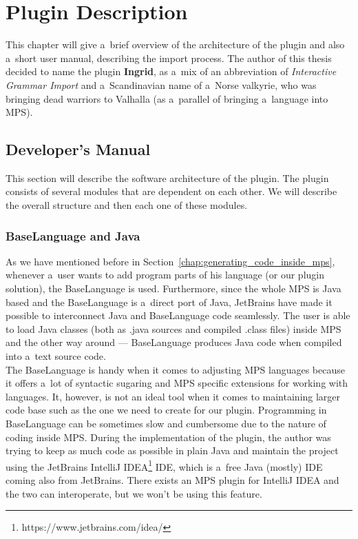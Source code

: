 \chapter{Plugin Description}

This chapter will give a~brief overview of the architecture of the plugin and also a~short user manual, describing the import process.
The author of this thesis decided to name the plugin \textbf{Ingrid}, as a~mix of an abbreviation of \textit{Interactive Grammar Import} and a~Scandinavian name of a~Norse valkyrie, who was bringing dead warriors to Valhalla (as a~parallel of bringing a~language into MPS).

\section{Developer's Manual}
\label{chap:dev_manual}

This section will describe the software architecture of the plugin.
The plugin consists of several modules that are dependent on each other.
We will describe the overall structure and then each one of these modules.

\subsection{BaseLanguage and Java}

As we have mentioned before in Section~\ref{chap:generating_code_inside_mps}, whenever a~user wants to add program parts of his language (or our plugin solution), the BaseLanguage is used.
Furthermore, since the whole MPS is Java based and the BaseLanguage is a~direct port of Java, JetBrains have made it possible to interconnect Java and BaseLanguage code seamlessly.
The user is able to load Java classes (both as .java sources and compiled .class files) inside MPS and the other way around --- BaseLanguage produces Java code when compiled into a~text source code.
\\

The BaseLanguage is handy when it comes to adjusting MPS languages because it offers a~lot of syntactic sugaring and MPS specific extensions for working with languages.
It, however, is not an ideal tool when it comes to maintaining larger code base such as the one we need to create for our plugin.
Programming in BaseLanguage can be sometimes slow and cumbersome due to the nature of coding inside MPS.
During the implementation of the plugin, the author was trying to keep as much code as possible in plain Java and maintain the project using the JetBrains IntelliJ IDEA\footnote{https://www.jetbrains.com/idea/} IDE, which is a~free Java (mostly) IDE coming also from JetBrains.
There exists an MPS plugin for IntelliJ IDEA and the two can interoperate, but we won't be using this feature.
\\


